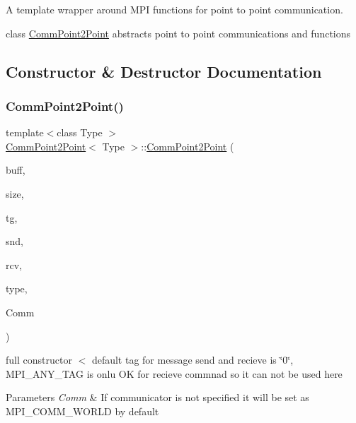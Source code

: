 A template wrapper around M\+PI functions for point to point communication. 

class \mbox{\hyperlink{classCommPoint2Point}{Comm\+Point2\+Point}} abstracts point to point communications and functions 

\subsection{Constructor \& Destructor Documentation}
\mbox{\label{classCommPoint2Point_aa23f80d9c92ccc7d1ce601ec829c6ff7}} 
\subsubsection{\texorpdfstring{Comm\+Point2\+Point()}{CommPoint2Point()}\hspace{0.1cm}{\footnotesize\ttfamily [1/3]}}
{\footnotesize\ttfamily template$<$class Type $>$ \\
\mbox{\hyperlink{classCommPoint2Point}{Comm\+Point2\+Point}}$<$ Type $>$\+::\mbox{\hyperlink{classCommPoint2Point}{Comm\+Point2\+Point}} (\begin{DoxyParamCaption}\item[{void $\ast$}]{buff,  }\item[{\mbox{\hyperlink{definitions_8h_a69aa29b598b851b0640aa225a9e5d61d}{uint}}}]{size,  }\item[{\mbox{\hyperlink{definitions_8h_a69aa29b598b851b0640aa225a9e5d61d}{uint}} $\ast$}]{tg,  }\item[{\mbox{\hyperlink{definitions_8h_a69aa29b598b851b0640aa225a9e5d61d}{uint}}}]{snd,  }\item[{\mbox{\hyperlink{definitions_8h_a69aa29b598b851b0640aa225a9e5d61d}{uint}}}]{rcv,  }\item[{\mbox{\hyperlink{definitions_8h_a69aa29b598b851b0640aa225a9e5d61d}{uint}}}]{type,  }\item[{M\+P\+I\+\_\+\+Comm}]{Comm }\end{DoxyParamCaption})}

full constructor $<$ default tag for message send and recieve is \char`\"{}0\char`\"{}, M\+P\+I\+\_\+\+A\+N\+Y\+\_\+\+T\+AG is onlu OK for recieve commnad so it can not be used here 
\begin{DoxyParams}{Parameters}
{\em Comm} & If communicator is not specified it will be set as M\+P\+I\+\_\+\+C\+O\+M\+M\+\_\+\+W\+O\+R\+LD by default \\
\hline
\end{DoxyParams}
\mbox{\label{classCommPoint2Point_a2d595c46eb1c130069ad90c9782cf63e}} 
